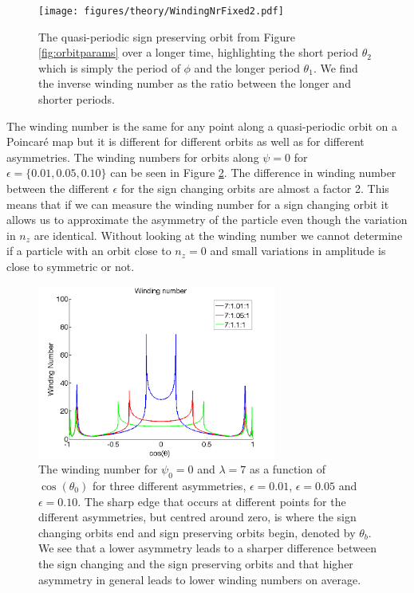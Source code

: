 \begin{figure}[H]
\begin{center}
\texttt{[image: figures/theory/WindingNrFixed2.pdf]}
\end{center}
\caption{The quasi-periodic sign preserving orbit from Figure \ref{fig:orbitparams} over a longer time, highlighting the short period $\theta_2$ which is simply the period of $\phi$ and the longer period $\theta_1$. We find the inverse winding number as the ratio between the longer and shorter periods.}
\label{fig:windingDef}
\end{figure}

The winding number is the same for any point along a quasi-periodic orbit on a Poincaré map but it is different for different orbits as well as for different asymmetries. The winding numbers for orbits along $\psi=0$ for $\epsilon=\{0.01, 0.05, 0.10\}$ can be seen in Figure \ref{fig:windingdifferent}. The difference in winding number between the different $\epsilon$ for the sign changing orbits are almost a factor 2. This means that if we can measure the winding number for a sign changing orbit it allows us to approximate the asymmetry of the particle even though the variation in $n_z$ are identical. Without looking at the winding number we cannot determine if a particle with an orbit close to $n_z = 0$ and small variations in amplitude is close to symmetric or not.
 
\begin{figure}[H]
\begin{center}
\includegraphics[width=0.7\textwidth]{figures/theory/WindingTrend.png}
\end{center}
\caption{The winding number for $\psi_0 = 0$ and $\lambda = 7$ as a function of $\cos(\theta_0)$ for three different asymmetries, $\epsilon = 0.01$, $\epsilon = 0.05$ and $\epsilon = 0.10$. The sharp edge that occurs at different points for the different asymmetries, but centred around zero, is where the sign changing orbits end and sign preserving orbits begin, denoted by $\theta_b$. We see that a lower asymmetry leads to a sharper difference between the sign changing and the sign preserving orbits and that higher asymmetry in general leads to lower winding numbers on average.}
\label{fig:windingdifferent}
\end{figure}
